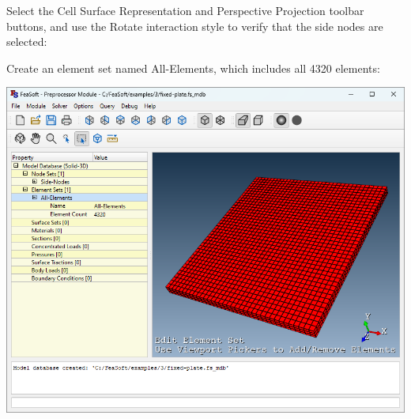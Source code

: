 \documentclass[
    11pt,        %
    a4paper,     %
    final,       %
    fleqn,       %
    notitlepage, %
    onecolumn,   %
    oneside,     %
]{article}
\begin{document}
Select the Cell Surface Representation and Perspective Projection toolbar buttons, and use the Rotate interaction style to verify that the side nodes are selected:
\begin{center}
\end{center}

Create an element set named All-Elements, which includes all 4320 elements:
\begin{center}
    \includegraphics[scale=0.5]{fig/ui-3-5.png}
\end{center}
\end{document}
